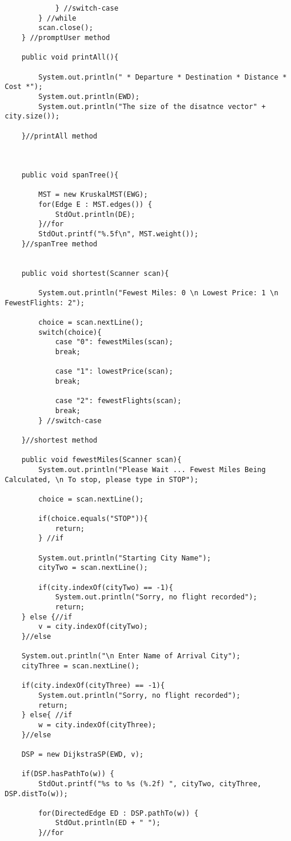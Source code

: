 \documentclass{article}
\begin{document}
\begin{lstlisting}
			} //switch-case
		} //while 
		scan.close();
	} //promptUser method

	public void printAll(){

		System.out.println(" * Departure * Destination * Distance * Cost *");
		System.out.println(EWD);
		System.out.println("The size of the disatnce vector" + city.size());

	}//printAll method



	public void spanTree(){

		MST = new KruskalMST(EWG);
		for(Edge E : MST.edges()) {
			StdOut.println(DE);
		}//for
		StdOut.printf("%.5f\n", MST.weight());
	}//spanTree method


	public void shortest(Scanner scan){

		System.out.println("Fewest Miles: 0 \n Lowest Price: 1 \n FewestFlights: 2");

		choice = scan.nextLine();
		switch(choice){
			case "0": fewestMiles(scan);
			break;

			case "1": lowestPrice(scan);
			break;

			case "2": fewestFlights(scan);
			break;
		} //switch-case

	}//shortest method	

	public void fewestMiles(Scanner scan){
		System.out.println("Please Wait ... Fewest Miles Being Calculated, \n To stop, please type in STOP");

		choice = scan.nextLine();

		if(choice.equals("STOP")){
			return;
		} //if

		System.out.println("Starting City Name");
		cityTwo = scan.nextLine();

		if(city.indexOf(cityTwo) == -1){
			System.out.println("Sorry, no flight recorded");
			return;
	} else {//if
		v = city.indexOf(cityTwo);
	}//else	

	System.out.println("\n Enter Name of Arrival City");
	cityThree = scan.nextLine();

	if(city.indexOf(cityThree) == -1){
		System.out.println("Sorry, no flight recorded");
		return;
	} else{ //if
		w = city.indexOf(cityThree);
	}//else

	DSP = new DijkstraSP(EWD, v);

	if(DSP.hasPathTo(w)) {
		StdOut.printf("%s to %s (%.2f) ", cityTwo, cityThree, DSP.distTo(w));

		for(DirectedEdge ED : DSP.pathTo(w)) {
			StdOut.println(ED + " ");
		}//for


\end{lstlisting}
\end{document}
